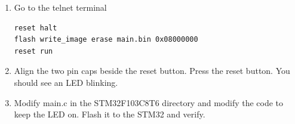 \documentclass[journal,12pt,twocolumn]{IEEEtran}
\begin{document}
\begin{enumerate}[1.]
\item Go to the telnet terminal 
\begin{lstlisting}
reset halt
flash write_image erase main.bin 0x08000000
reset run
\end{lstlisting}
\item Align the two pin caps beside the reset button. Press the reset button.  You should see an LED blinking.
\item Modify main.c in the STM32F103C8T6 directory and modify the code to keep the LED on. Flash it to the STM32 and verify.
%
\end{enumerate}
\end{document}
